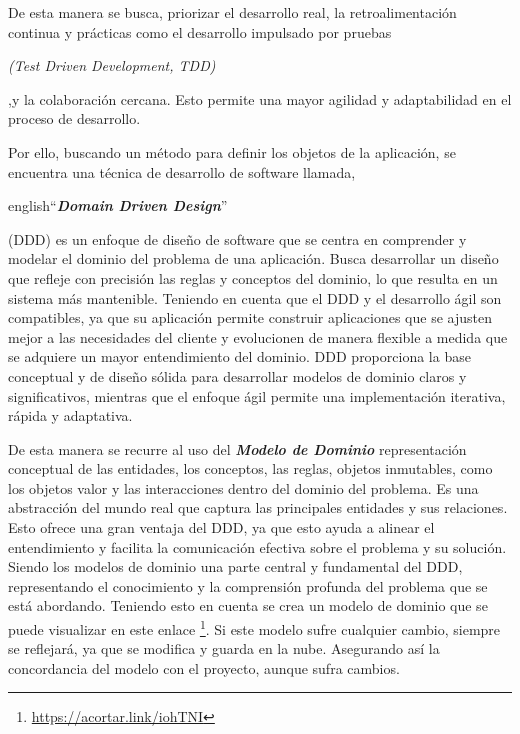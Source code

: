 De esta manera se busca, priorizar el desarrollo real, la retroalimentación continua y prácticas como 
el desarrollo impulsado por pruebas \begin{otherlanguage}{english}\textit{(Test Driven Development, TDD)}\end{otherlanguage}  ,y la colaboración cercana. Esto permite una mayor 
agilidad y adaptabilidad en el proceso de desarrollo.

Por ello, buscando un método para definir los objetos de la aplicación, se encuentra una técnica de 
desarrollo de software llamada, \begin{otherlanguage}
{english}``\textit{\textbf{Domain Driven Design}}''\end{otherlanguage}(DDD) es un enfoque de diseño de 
software que se centra en comprender y modelar el dominio del problema de una aplicación. Busca 
desarrollar un diseño que refleje con precisión las reglas y conceptos del dominio, lo que resulta en 
un sistema más mantenible. Teniendo en cuenta que el DDD y el desarrollo ágil son compatibles, ya que 
su aplicación permite construir aplicaciones que se ajusten mejor a las necesidades del cliente y 
evolucionen de manera flexible a medida que se adquiere un mayor entendimiento del dominio. DDD 
proporciona la base conceptual y de diseño sólida para desarrollar modelos de dominio claros y 
significativos, mientras que el enfoque ágil permite una implementación iterativa, rápida y adaptativa.

De esta manera se recurre al uso del \textit{\textbf{Modelo de Dominio}} representación conceptual de 
las entidades, los conceptos, las reglas, objetos inmutables, como los objetos valor y las 
interacciones dentro del dominio del problema. Es una abstracción del mundo real que captura las 
principales entidades y sus relaciones. Esto ofrece una gran ventaja del DDD, ya que esto ayuda a 
alinear el entendimiento y facilita la comunicación efectiva sobre el problema y su solución. Siendo 
los modelos de dominio una parte central y fundamental del DDD, representando el conocimiento y la 
comprensión profunda del problema que se está abordando. Teniendo esto en cuenta se crea un modelo de 
dominio que se puede visualizar en este enlace \footnote{\url{https://acortar.link/iohTNI}}. Si este 
modelo sufre cualquier cambio, siempre se reflejará, ya que se modifica y guarda en la nube. Asegurando 
así la concordancia del modelo con el proyecto, aunque sufra cambios.

